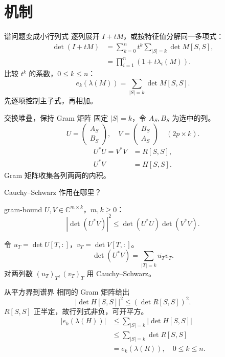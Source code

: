\documentclass{beamer}
\begin{document}
\section{机制}
\begin{frame}{谱问题变成小行列式}
逐列展开 $I+tM$，或按特征值分解同一多项式：
\begin{align*}
\det(I+tM)&=\sum_{k=0}^n t^k\sum_{|S|=k}\det M[S,S],\\
&=\prod_{i=1}^n(1+t\lambda_i(M)).
\end{align*}
比较 $t^k$ 的系数，$0\leq k\leq n$：
\[
e_k(\lambda(M))=\sum_{|S|=k}\det M[S,S].
\]
\alert{先逐项控制主子式，再相加。}
\end{frame}
\begin{frame}{交换堆叠，保持 Gram 矩阵}
固定 $|S|=k$，令 $A_S,B_S$ 为选中的列。
\[
U=\begin{pmatrix}A_S\\B_S\end{pmatrix},\quad
V=\begin{pmatrix}B_S\\A_S\end{pmatrix}
\quad (2p\times k).
\]
\begin{align*}
U^*U=V^*V&=R[S,S],\\
U^*V&=H[S,S].
\end{align*}
Gram 矩阵收集各列两两的内积。
\end{frame}
\begin{frame}{Cauchy–Schwarz 作用在哪里？}
\begin{bookresult}{gram-bound}
$U,V\in\mathbb C^{m\times k}$，$m,k\geq0$：
\[
|\det(U^*V)|^2\leq\det(U^*U)\det(V^*V).
\]
\end{bookresult}
令 $u_T=\det U[T,:]$，$v_T=\det V[T,:]$。
\[
\det(U^*V)=\sum_{|T|=k}\overline{u_T}v_T.
\]
对两列数 $(u_T)_T,(v_T)_T$ 用 Cauchy–Schwarz。
\end{frame}
\begin{frame}{从平方界到谱界}
相同的 Gram 矩阵给出
\[
|\det H[S,S]|^2\leq(\det R[S,S])^2.
\]
$R[S,S]$ 正半定，故行列式非负，可开平方。
\begin{align*}
|e_k(\lambda(H))|&\leq\sum_{|S|=k}|\det H[S,S]|\\
&\leq\sum_{|S|=k}\det R[S,S]\\
&=e_k(\lambda(R)),\quad 0\leq k\leq n.
\end{align*}
\end{frame}
\end{document}
